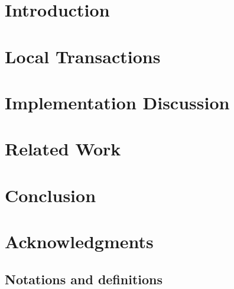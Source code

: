 \documentclass{vldb}
\newcommand\MyIncludeGraphics[2][]{%
    \IfFileExists{#2}{%
        \texttt{[image: \#2]}%
    }{%
        \missingfigure[figwidth=2.0cm]{}%
    }%
}%
\begin{document}
\maketitle

\sloppy


\begin{abstract}

\end{abstract}


\section{Introduction} \label{sec:intro}

\section{Local Transactions}%
\label{sec:techniques}



\section{Implementation Discussion} \label{sec:discussion}

\section{Related Work}


\section{Conclusion}

\ifblind
\else
\section{Acknowledgments}

\fi







\begin{appendix}
	
	\section{Notations and definitions} \label{sec:app1}


\end{appendix}
\end{document}
